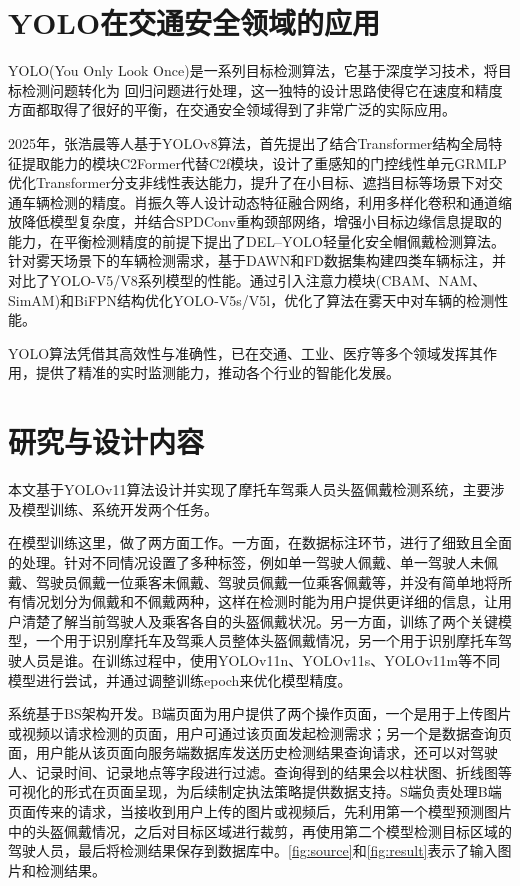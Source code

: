 \section{YOLO在交通安全领域的应用}
YOLO(You Only Look Once)是一系列目标检测算法，它基于深度学习技术，将目标检测问题转化为
回归问题进行处理，这一独特的设计思路使得它在速度和精度方面都取得了很好的平衡，在交通安全领域得到了非常广泛的实际应用。

2025年，张浩晨等人基于YOLOv8算法，首先提出了结合Transformer结构全局特征提取能力的模块C2Former代替C2f模块，设计了重感知的门控线性单元GRMLP优化Transformer分支非线性表达能力，提升了在小目标、遮挡目标等场景下对交通车辆检测的精度\cite{ex1}。肖振久等人设计动态特征融合网络，利用多样化卷积和通道缩放降低模型复杂度，并结合SPDConv重构颈部网络，增强小目标边缘信息提取的能力，在平衡检测精度的前提下提出了DEL–YOLO轻量化安全帽佩戴检测算法\cite{ex2}。\textcite{ex3}针对雾天场景下的车辆检测需求，基于DAWN和FD数据集构建四类车辆标注，并对比了YOLO-V5/V8系列模型的性能。通过引入注意力模块(CBAM、NAM、SimAM)和BiFPN结构优化YOLO-V5s/V5l，优化了算法在雾天中对车辆的检测性能。

YOLO算法凭借其高效性与准确性，已在交通、工业、医疗等多个领域发挥其作用，提供了精准的实时监测能力，推动各个行业的智能化发展。

\section{研究与设计内容}

本文基于YOLOv11算法设计并实现了摩托车驾乘人员头盔佩戴检测系统，主要涉及模型训练、系统开发两个任务。

在模型训练这里，做了两方面工作。一方面，在数据标注环节，进行了细致且全面的处理。针对不同情况设置了多种标签，例如单一驾驶人佩戴、单一驾驶人未佩戴、驾驶员佩戴一位乘客未佩戴、驾驶员佩戴一位乘客佩戴等，并没有简单地将所有情况划分为佩戴和不佩戴两种，这样在检测时能为用户提供更详细的信息，让用户清楚了解当前驾驶人及乘客各自的头盔佩戴状况。另一方面，训练了两个关键模型，一个用于识别摩托车及驾乘人员整体头盔佩戴情况，另一个用于识别摩托车驾驶人员是谁。在训练过程中，使用YOLOv11n、YOLOv11s、YOLOv11m等不同模型进行尝试，并通过调整训练epoch来优化模型精度。

系统基于BS架构开发。B端页面为用户提供了两个操作页面，一个是用于上传图片或视频以请求检测的页面，用户可通过该页面发起检测需求；另一个是数据查询页面，用户能从该页面向服务端数据库发送历史检测结果查询请求，还可以对驾驶人、记录时间、记录地点等字段进行过滤。查询得到的结果会以柱状图、折线图等可视化的形式在页面呈现，为后续制定执法策略提供数据支持。S端负责处理B端页面传来的请求，当接收到用户上传的图片或视频后，先利用第一个模型预测图片中的头盔佩戴情况，之后对目标区域进行裁剪，再使用第二个模型检测目标区域的驾驶人员，最后将检测结果保存到数据库中。\ref{fig:source}和\ref{fig:result}表示了输入图片和检测结果。

